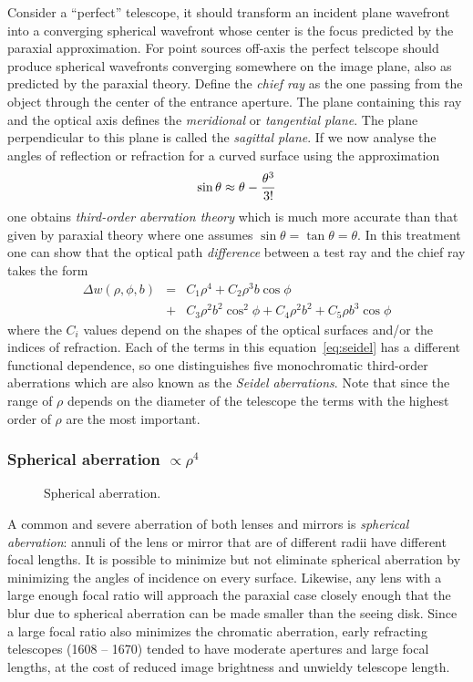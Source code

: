 \documentclass{article}
\newcommand{\bea}[1]{\begin{eqnarray}\label{#1}}
\newcommand{\eea}{\end{eqnarray}}
\begin{document}
Consider a ``perfect'' telescope, it should transform an incident plane wavefront into
a converging spherical wavefront whose center is the focus predicted by the paraxial 
approximation. For point sources off-axis the perfect telscope should produce spherical
wavefronts converging somewhere on the image plane, also as predicted by the paraxial 
theory. Define the {\it chief ray} as the one passing from the object through the center
of the entrance aperture. The plane containing this ray and the optical axis defines the
{\it meridional} or {\it tangential plane}. The plane perpendicular to this plane is called
the {\it sagittal plane}. If we now analyse the angles of reflection or refraction for a 
curved surface using the approximation 
\[
\sin\theta\approx\theta-{\theta^3\over 3!}
\] 
one obtains {\it third-order aberration theory} which is much more accurate than that
given by paraxial theory where one assumes $\sin\theta=\tan\theta=\theta$. In this 
treatment one can show that the optical path {\it difference} between a test ray and the
chief ray takes the form
\bea{eq:seidel}
\Delta w(\rho,\phi,b)&=&C_1\rho^4+C_2\rho^3b\cos\phi \\
                                &+&C_3\rho^2b^2\cos^2\phi+C_4\rho^2b^2+C_5\rho b^3\cos\phi
\eea
where the $C_i$ values depend on the shapes of the optical surfaces and/or the indices of
refraction. Each of the terms in this equation~\ref{eq:seidel} has a different functional
dependence, so one distinguishes five monochromatic third-order aberrations which are
also known as the {\it Seidel aberrations}. Note that since the range of $\rho$ depends on 
the diameter of the telescope the terms with the highest order of $\rho$ are the most
important.

\subsubsection{Spherical aberration $\propto\rho^4$}

\begin{figure}[th!]
  \hfil{}\hfil
  \caption{Spherical aberration.}
  \label{fig:spherical-aberration}
\end{figure}

A common and severe aberration of both lenses and mirrors is {\it spherical 
aberration}: annuli of the lens or mirror that are of different radii have 
different focal lengths. It is possible to minimize but not eliminate spherical
aberration by minimizing the angles of incidence on every surface. Likewise,
any lens with a large enough focal ratio will approach the paraxial case closely enough
that the blur due to spherical aberration can be made smaller than the seeing disk.
Since a large focal ratio also minimizes the chromatic aberration, early refracting telescopes 
(1608 -- 1670) tended to have moderate apertures and large focal lengths, at the cost
of reduced image brightness and unwieldy telescope length.
\end{document}
